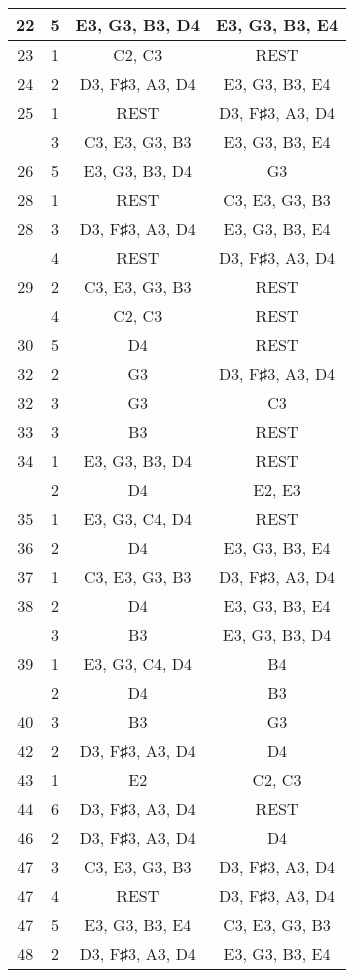 \documentclass{article}
\begin{document}
\begin{longtable}{|c|c|c|c|}
\hline
22 & 5 & E3, G3, B3, D4 & E3, G3, B3, E4 \\ 
\hline
23 & 1 & C2, C3 & REST \\ 
\hline
24 & 2 & D3, F♯3, A3, D4 & E3, G3, B3, E4 \\ 
\hline
25 & 1 & REST & D3, F♯3, A3, D4 \\ 
  & 3 & C3, E3, G3, B3 & E3, G3, B3, E4 \\ 
\hline
26 & 5 & E3, G3, B3, D4 & G3 \\ 
\hline
28 & 1 & REST & C3, E3, G3, B3 \\ 
\hline
28 & 3 & D3, F♯3, A3, D4 & E3, G3, B3, E4 \\ 
  & 4 & REST & D3, F♯3, A3, D4 \\ 
\hline
29 & 2 & C3, E3, G3, B3 & REST \\ 
  & 4 & C2, C3 & REST \\ 
\hline
30 & 5 & D4 & REST \\ 
\hline
32 & 2 & G3 & D3, F♯3, A3, D4 \\ 
\hline
32 & 3 & G3 & C3 \\ 
\hline
33 & 3 & B3 & REST \\ 
\hline
34 & 1 & E3, G3, B3, D4 & REST \\ 
  & 2 & D4 & E2, E3 \\ 
\hline
35 & 1 & E3, G3, C4, D4 & REST \\ 
\hline
36 & 2 & D4 & E3, G3, B3, E4 \\ 
\hline
37 & 1 & C3, E3, G3, B3 & D3, F♯3, A3, D4 \\ 
\hline
38 & 2 & D4 & E3, G3, B3, E4 \\ 
  & 3 & B3 & E3, G3, B3, D4 \\ 
\hline
39 & 1 & E3, G3, C4, D4 & B4 \\ 
  & 2 & D4 & B3 \\ 
\hline
40 & 3 & B3 & G3 \\ 
\hline
42 & 2 & D3, F♯3, A3, D4 & D4 \\ 
\hline
43 & 1 & E2 & C2, C3 \\ 
\hline
44 & 6 & D3, F♯3, A3, D4 & REST \\ 
\hline
46 & 2 & D3, F♯3, A3, D4 & D4 \\ 
\hline
47 & 3 & C3, E3, G3, B3 & D3, F♯3, A3, D4 \\ 
\hline
47 & 4 & REST & D3, F♯3, A3, D4 \\ 
\hline
47 & 5 & E3, G3, B3, E4 & C3, E3, G3, B3 \\ 
\hline
48 & 2 & D3, F♯3, A3, D4 & E3, G3, B3, E4 \\ 

\end{longtable}
\end{document}
